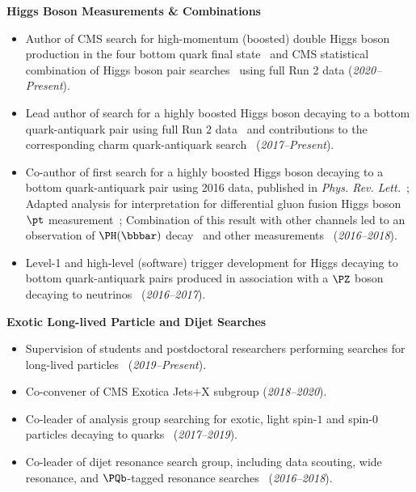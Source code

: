 \documentclass[11pt]{res}
\begin{document}
\begin{resume}
  \textbf{Higgs Boson Measurements \& Combinations}
  \begin{itemize}
    \item Author of CMS search for high-momentum (boosted) double Higgs boson production in the four bottom quark final state~\cite{CMS:2022nmn} and CMS statistical combination of Higgs boson pair searches~\cite{CMS:2022dwd} using full Run 2 data (\textit{2020--Present}).
    \item Lead author of search for a highly boosted Higgs boson decaying to a bottom quark-antiquark pair using full Run 2 data~\cite{Sirunyan:2020hwz} and contributions to the corresponding charm quark-antiquark search~\cite{CMS-PAS-HIG-21-012} (\textit{2017--Present}).
    \item Co-author of first search for a highly boosted Higgs boson decaying to a bottom quark-antiquark pair using 2016 data, published in \emph{Phys. Rev. Lett.}~\cite{Sirunyan:2017dgc}; Adapted analysis for interpretation for differential gluon fusion Higgs boson $\pt$ measurement~\cite{Sirunyan:2018sgc}; Combination of this result with other channels led to an observation of $\PH(\bbbar)$ decay~\cite{Sirunyan:2018kst} and other measurements~\cite{Sirunyan:2018koj} (\textit{2016--2018}).
    \item Level-1 and high-level (software) trigger development for Higgs decaying to bottom quark-antiquark pairs produced in association with a $\PZ$ boson decaying to neutrinos~\cite{Sirunyan:2018kst} (\textit{2016--2017}).
  \end{itemize}

  \textbf{Exotic Long-lived Particle and Dijet Searches}
  \begin{itemize}
    \item Supervision of students and postdoctoral researchers performing searches for long-lived particles~\cite{CMS:2021yhb,CMS:2021juv} (\textit{2019--Present}).
    \item Co-convener of CMS Exotica Jets+X subgroup (\textit{2018--2020}).
    \item Co-leader of analysis group searching for exotic, light spin-$1$ and spin-$0$ particles decaying to quarks~\cite{Sirunyan:2019vxa,Sirunyan:2019sgo,Sirunyan:2018ikr,Sirunyan:2017nvi} (\textit{2017--2019}).
    \item Co-leader of dijet resonance search group, including data scouting, wide resonance, and $\PQb$-tagged resonance searches~\cite{Sirunyan:2019pnb,Sirunyan:2019vgj,CMS-PAS-EXO-17-026,Duarte:2018bsd,Sirunyan:2018xlo,Sirunyan:2016iap} (\textit{2016--2018}).
  \end{itemize}


\end{resume}
\end{document}
